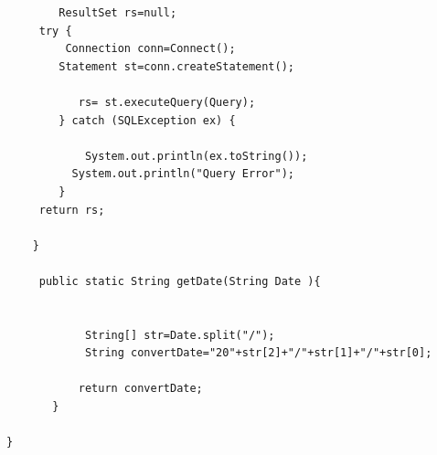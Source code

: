 \begin{lstlisting}
        ResultSet rs=null;
     try {
         Connection conn=Connect();
        Statement st=conn.createStatement();
       
           rs= st.executeQuery(Query);
        } catch (SQLException ex) {
            
            System.out.println(ex.toString());
          System.out.println("Query Error");
        }
     return rs;
        
    }
    
     public static String getDate(String Date ){
       
           
            String[] str=Date.split("/");
            String convertDate="20"+str[2]+"/"+str[1]+"/"+str[0];
            
           return convertDate;
       }
    
}

\end{lstlisting}

